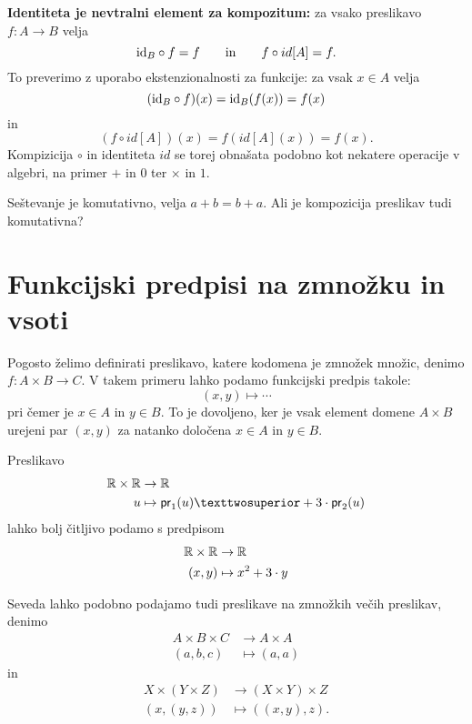 \textbf{Identiteta je nevtralni element za kompozitum:} za vsako preslikavo $f : A \to B$ velja
%
\begin{equation*}
  \id[B] \circ f = f
  \iinn
  f \circ id[A] = f.
\end{equation*}
%
To preverimo z uporabo ekstenzionalnosti za funkcije: za vsak $x \in A$ velja
%
\begin{equation*}
    (\id[B] \circ f)(x) = \id[B] (f(x)) = f(x)
\end{equation*}
%
in
\begin{equation*}
  (f \circ id[A])(x) = f (id[A](x)) = f(x).
\end{equation*}
%
Kompizicija $\circ$ in identiteta $id$ se torej obnašata podobno kot nekatere operacije v algebri, na primer $+$ in $0$ ter $×$ in $1$.

\begin{naloga}
  Seštevanje je komutativno, velja $a + b = b + a$. Ali je kompozicija preslikav tudi komutativna?
\end{naloga}

\section{Funkcijski predpisi na zmnožku in vsoti}

Pogosto želimo definirati preslikavo, katere kodomena je zmnožek množic, denimo $f : A \times B \to C$. V takem primeru lahko
podamo funkcijski predpis takole:
%
\begin{equation*}
  (x, y) \mapsto \cdots
\end{equation*}
%
pri čemer je $x \in A$ in $y \in B$. To je dovoljeno, ker je vsak element domene $A \times B$ urejeni par $(x, y)$ za natanko določena $x \in A$ in $y \in B$.

\begin{primer}

Preslikavo
%
\begin{align*}
  \RR \times \RR  &\to  \RR \\
  u &\mapsto  \fst{u}² + 3 \cdot \snd{u}
\end{align*}
%
lahko bolj čitljivo podamo s predpisom
%
\begin{align*}
  \RR \times \RR  &\to  \RR \\
  (x, y) &\mapsto  x^2 + 3 \cdot y
\end{align*}
\end{primer}

\begin{primer}
  Seveda lahko podobno podajamo tudi preslikave na zmnožkih večih preslikav, denimo
  \begin{align*}
  A \times B \times C &\to A \times A \\
  (a, b, c) &\mapsto (a, a)
  \end{align*}
  in
  \begin{align*}
  X \times (Y \times Z) &\to (X \times Y) \times Z \\
  (x, (y, z)) &\mapsto ((x, y), z).
  \end{align*}
\end{primer}

